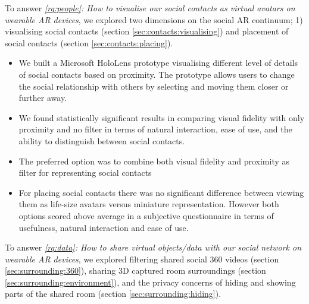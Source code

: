 To answer \textit{\ref{rq:people}: How to visualise our social contacts as virtual avatars on wearable AR devices}, we explored two dimensions on the social AR continuum; 1) visualising social contacts (section \ref{sec:contacts:visualising}) and placement of social contacts (section \ref{sec:contacts:placing}). 

\begin{itemize}
    \item{We built a Microsoft HoloLens prototype visualising different level of details of social contacts based on proximity. The prototype allows users to change the social relationship with others by selecting and moving them closer or further away.}
    \item{We found statistically significant results in comparing visual fidelity with only proximity and no filter in terms of natural interaction, ease of use, and the ability to distinguish between social contacts.}
    \item{The preferred option was to combine both visual fidelity and proximity as filter for representing social contacts}
    \item{For placing social contacts there was no significant difference between viewing them as life-size avatars versus miniature representation. However both options scored above average in a subjective questionnaire in terms of usefulness, natural interaction and ease of use.}
\end{itemize}

To answer \textit{\ref{rq:data}: How to share virtual objects/data with our social network on wearable AR devices}, we explored filtering shared social 360 videos (section \ref{sec:surrounding:360}), sharing 3D captured room surroundings (section \ref{sec:surrounding:environment}), and the privacy concerns of hiding and showing parts of the shared room (section \ref{sec:surrounding:hiding}). 

